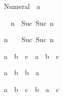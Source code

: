 \begin{isabellebody}
\begin{isamarkuptext}
\begin{isabelle}%
Numeral{}\ {\isacharequal}\ {\isacharparenleft}{}{\isasymColon}{\isacharprime}a{\isacharparenright}%
\end{isabelle}

\begin{isabelle}%
{}\ {\isacharplus}\ n\ {\isacharequal}\ Suc\ {\isacharparenleft}Suc\ n{\isacharparenright}%
\end{isabelle}

\begin{isabelle}%
n\ {\isacharplus}\ {}\ {\isacharequal}\ Suc\ {\isacharparenleft}Suc\ n{\isacharparenright}%
\end{isabelle}

\begin{isabelle}%
a\ {\isacharplus}\ b\ {\isacharplus}\ c\ {\isacharequal}\ a\ {\isacharplus}\ {\isacharparenleft}b\ {\isacharplus}\ c{\isacharparenright}%
\end{isabelle}

\begin{isabelle}%
a\ {\isacharplus}\ b\ {\isacharequal}\ b\ {\isacharplus}\ a%
\end{isabelle}

\begin{isabelle}%
a\ {\isacharplus}\ {\isacharparenleft}b\ {\isacharplus}\ c{\isacharparenright}\ {\isacharequal}\ b\ {\isacharplus}\ {\isacharparenleft}a\ {\isacharplus}\ c{\isacharparenright}%
\end{isabelle}


\end{isamarkuptext}
\end{isabellebody}
